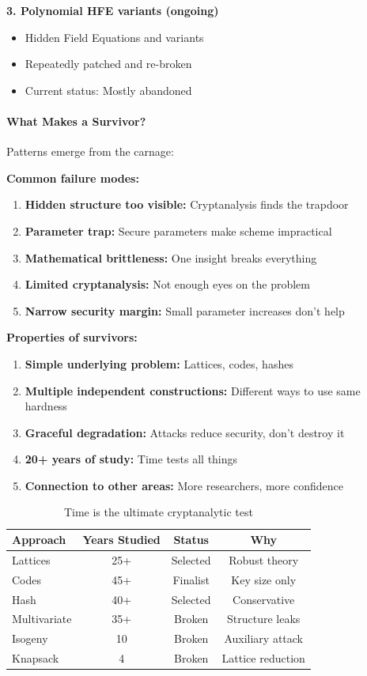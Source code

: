 \documentclass[11pt,a4paper]{article}
\begin{document}
\textbf{3. Polynomial HFE variants (ongoing)}
\begin{itemize}
    \item Hidden Field Equations and variants
    \item Repeatedly patched and re-broken
    \item Current status: Mostly abandoned
\end{itemize}

\paragraph{What Makes a Survivor?}

Patterns emerge from the carnage:

\textbf{Common failure modes:}
\begin{enumerate}
    \item \textbf{Hidden structure too visible:} Cryptanalysis finds the trapdoor
    \item \textbf{Parameter trap:} Secure parameters make scheme impractical
    \item \textbf{Mathematical brittleness:} One insight breaks everything
    \item \textbf{Limited cryptanalysis:} Not enough eyes on the problem
    \item \textbf{Narrow security margin:} Small parameter increases don't help
\end{enumerate}

\textbf{Properties of survivors:}
\begin{enumerate}
    \item \textbf{Simple underlying problem:} Lattices, codes, hashes
    \item \textbf{Multiple independent constructions:} Different ways to use same hardness
    \item \textbf{Graceful degradation:} Attacks reduce security, don't destroy it
    \item \textbf{20+ years of study:} Time tests all things
    \item \textbf{Connection to other areas:} More researchers, more confidence
\end{enumerate}

\begin{table}[h]
\centering
\begin{tabular}{|l|c|c|c|}
\hline
\textbf{Approach} & \textbf{Years Studied} & \textbf{Status} & \textbf{Why} \\
\hline
Lattices & 25+ & Selected & Robust theory \\
Codes & 45+ & Finalist & Key size only \\
Hash & 40+ & Selected & Conservative \\
Multivariate & 35+ & Broken & Structure leaks \\
Isogeny & 10 & Broken & Auxiliary attack \\
Knapsack & 4 & Broken & Lattice reduction \\
\hline
\end{tabular}
\caption{Time is the ultimate cryptanalytic test}
\end{table}
\end{document}
